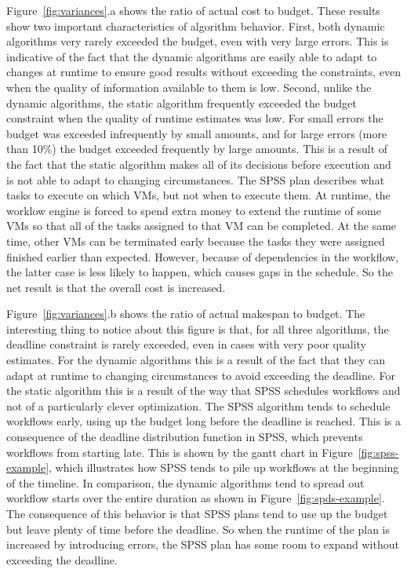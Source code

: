 \documentclass[conference]{IEEEtran}
\begin{document}
Figure~\ref{fig:variances}.a shows the ratio of actual cost to budget. These results show two important characteristics of algorithm behavior. First, both dynamic algorithms very rarely exceeded the budget, even with very large errors. This is indicative of the fact that the dynamic algorithms are easily able to adapt to changes at runtime to ensure good results without exceeding the constraints, even when the quality of information available to them is low. Second, unlike the dynamic algorithms, the static algorithm frequently exceeded the budget constraint when the quality of runtime estimates was low. For small errors the budget was exceeded infrequently by small amounts, and for large errors (more than 10\%) the budget exceeded frequently by large amounts. This is a result of the fact that the static algorithm makes all of its decisions before execution and is not able to adapt to changing circumstances. The SPSS plan describes what tasks to execute on which VMs, but not when to execute them. At runtime, the worklow engine is forced to spend extra money to extend the runtime of some VMs so that all of the tasks assigned to that VM can be completed. At the same time, other VMs can be terminated early because the tasks they were assigned finished earlier than expected. However, because of dependencies in the workflow, the latter case is less likely to happen, which causes gaps in the schedule. So the net result is that the overall cost is increased.

Figure~\ref{fig:variances}.b shows the ratio of actual makespan to budget. The interesting thing to notice about this figure is that, for all three algorithms, the deadline constraint is rarely exceeded, even in cases with very poor quality estimates. For the dynamic algorithms this is a result of the fact that they can adapt at runtime to changing circumstances to avoid exceeding the deadline. For the static algorithm this is a result of the way that SPSS schedules workflows and not of a particularly clever optimization. The SPSS algorithm tends to schedule workflows early, using up the budget long before the deadline is reached. This is a consequence of the deadline distribution function in SPSS, which prevents workflows from starting late. This is shown by the gantt chart in Figure~\ref{fig:spss-example}, which illustrates how SPSS tends to pile up workflows at the beginning of the timeline. In comparison, the dynamic algorithms tend to spread out workflow starts over the entire duration as shown in Figure~\ref{fig:spds-example}. The consequence of this behavior is that SPSS plans tend to use up the budget but leave plenty of time before the deadline. So when the runtime of the plan is increased by introducing errors, the SPSS plan has some room to expand without exceeding the deadline.
\end{document}
